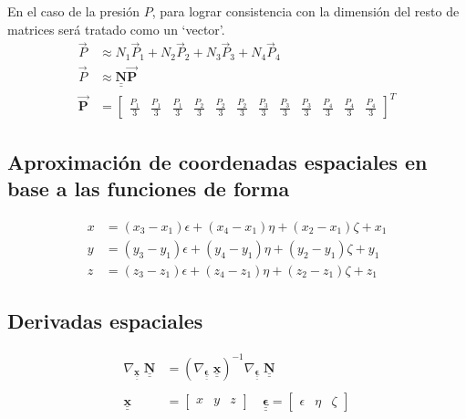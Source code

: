 \documentclass[12pt]{article}
\def\doubleunderline#1{\underline{\underline{#1}}}
\def\mt#1{\underline{\underline{\mathbf{#1}}}}
\newcommand{\vP}{\vec{P}}
\newcommand{\Pb}{\vec{\mathbf{P}}}
\newcommand{\nb}{\doubleunderline{\mathbf{N}}}
\begin{document}
En el caso de la presi\'on $P$, para lograr consistencia con la dimensi\'on del resto de matrices
ser\'a tratado como un `vector'.
\begin{align*}
	\vP &\approx  N_1 \vP_1 + N_2 \vP_2 + N_3 \vP_3 + N_4 \vP_4 \\
	\vP &\approx \nb \Pb \\
	\Pb &= \begin{bmatrix} \frac{P_1}{3} & \frac{P_1}{3} & \frac{P_1}{3} & \frac{P_2}{3} & \frac{P_2}{3} & \frac{P_2}{3} & \frac{P_3}{3} & \frac{P_3}{3} & \frac{P_3}{3} & \frac{P_4}{3} & \frac{P_4}{3} & \frac{P_4}{3} \end{bmatrix}^{T}
\end{align*}

\subsection{Aproximaci\'on de coordenadas espaciales en base a las funciones de forma}
\begin{align*}
	x &= (x_3 - x_1) \epsilon + (x_4 - x_1) \eta  + (x_2 - x_1) \zeta + x_1	 \\
	y &= (y_3 - y_1) \epsilon + (y_4 - y_1) \eta  + (y_2 - y_1) \zeta + y_1	 \\
	z &= (z_3 - z_1) \epsilon + (z_4 - z_1) \eta  + (z_2 - z_1) \zeta + z_1
\end{align*}

\subsection{Derivadas espaciales}
\begin{align*}
	\nabla_{\mt{x}} \; \nb &= \left(\nabla_{\mt{\epsilon}} \; \mt{x} \right)^{-1} \nabla_{\mt{\epsilon}} \; \nb \\ \\
	\mt{x} &= \begin{bmatrix} x & y & z \end{bmatrix} \quad \mt{\epsilon} = \begin{bmatrix} \epsilon & \eta & \zeta \end{bmatrix}
\end{align*}
\end{document}

